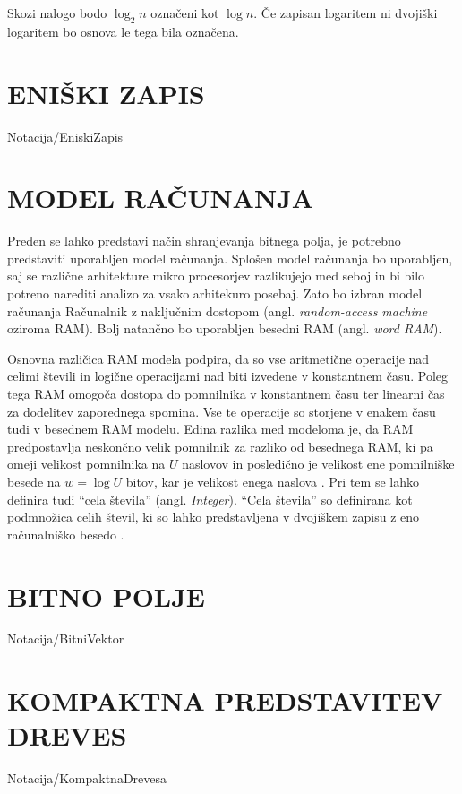 Skozi nalogo bodo $\log_2{n}$ označeni kot $\log{n}$. Če zapisan logaritem ni dvojiški logaritem bo osnova le tega bila označena.


\section{ENIŠKI ZAPIS}\label{sec:Eniski_Zapis}
{Notacija/EniskiZapis}

\section{MODEL RAČUNANJA}\label{sec:Model_racunanja}
Preden se lahko predstavi način shranjevanja bitnega polja, je potrebno predstaviti uporabljen model računanja. Splošen model računanja bo uporabljen, saj se različne arhitekture mikro procesorjev razlikujejo med seboj in bi bilo potreno narediti analizo za vsako arhitekuro posebaj. Zato bo izbran model računanja Računalnik z naključnim dostopom (angl. \textit{random-access machine} oziroma RAM). Bolj natančno bo uporabljen besedni RAM  (angl. \textit{word RAM}).

Osnovna različica RAM modela podpira, da so vse aritmetične operacije nad celimi števili in logične operacijami nad biti izvedene v konstantnem času. Poleg tega RAM omogoča dostopa do pomnilnika v konstantnem času ter linearni čas za dodelitev zaporednega spomina. Vse te operacije so storjene v enakem času tudi v besednem RAM modelu. Edina razlika med modeloma je, da RAM predpostavlja neskončno velik pomnilnik za razliko od besednega RAM, ki pa omeji velikost pomnilnika na $U$ naslovov in posledično je velikost ene pomnilniške besede na $w=\log{U}$ bitov, kar je velikost enega naslova \cite{Fredman1990,Morin2013,Navarro2016}. Pri tem se lahko definira tudi \enquote{cela števila} (angl. \textit{Integer}). \enquote{Cela števila} so definirana kot podmnožica celih števil, ki so lahko predstavljena v dvojiškem zapisu z eno računalniško besedo \cite{Navarro2016}.

\section{BITNO POLJE}\label{sec:Bitno_Polje}
{Notacija/BitniVektor}


\section{KOMPAKTNA PREDSTAVITEV DREVES}\label{sec:kompaktna_drevesa}
{Notacija/KompaktnaDrevesa}